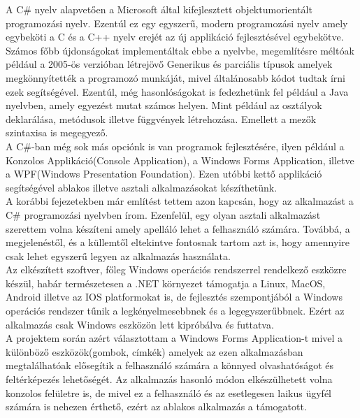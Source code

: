 \documentclass[tocnopagenum]{thesis-ekf}
\theoremstyle{definition}
\theoremstyle{remark}
\begin{document}
	A C\# nyelv alapvetően a Microsoft által kifejlesztett objektumorientált programozási nyelv.
	Ezentúl ez egy egyszerű, modern programozási nyelv amely egybeköti a C és a C++ nyelv erejét az új applikáció fejlesztésével egybekötve. \cite{hejlsberg2003c}
	\\ 
	Számos főbb újdonságokat implementáltak ebbe a nyelvbe, megemlítésre méltóak például a 2005-ös verzióban létrejövő Generikus és parciális típusok amelyek megkönnyítették a programozó munkáját, mivel általánosabb kódot tudtak írni ezek segítségével.
	Ezentúl, még hasonlóságokat is fedezhetünk fel például a Java nyelvben, amely egyezést mutat számos helyen.
	Mint például az osztályok deklarálása, metódusok illetve függvények létrehozása. Emellett a mezők szintaxisa is megegyező.
	\\
	A C\#-ban még sok más opciónk is van programok fejlesztésére, ilyen például a Konzolos Applikáció(Console Application), a Windows Forms Application, illetve a WPF(Windows Presentation Foundation). Ezen utóbbi kettő applikáció segítségével ablakos illetve asztali alkalmazásokat készíthetünk. \cite{almeida2018visual}
	\\
	A korábbi fejezetekben már említést tettem azon kapcsán, hogy az alkalmazást a C\# programozási nyelvben írom. Ezenfelül, egy olyan asztali alkalmazást szerettem volna készíteni amely apelláló lehet a felhasználó számára. Továbbá, a megjelenéstől, és a küllemtől eltekintve fontosnak tartom azt is, hogy amennyire csak lehet egyszerű legyen az alkalmazás használata.
	\\
	Az elkészített szoftver, főleg Windows operációs rendszerrel rendelkező eszközre készül, habár természetesen a .NET környezet támogatja a Linux, MacOS, Android illetve az IOS platformokat is, de fejlesztés szempontjából a Windows operációs rendszer tűnik a legkényelmesebbnek és a legegyszerűbbnek.\cite{altexsoft} Ezért az alkalmazás csak Windows eszközön lett kipróbálva és futtatva.
	\\
	A projektem során azért választottam a Windows Forms Application-t mivel a különböző eszközök(gombok, címkék) amelyek az ezen alkalmazásban megtalálhatóak elősegítik a felhasználó számára a könnyed olvashatóságot és feltérképezés lehetőségét. Az alkalmazás hasonló módon elkészülhetett volna konzolos felületre is, de mivel ez a felhasználó és az esetlegesen laikus ügyfél számára is nehezen érthető, ezért az ablakos alkalmazás a támogatott.
	\\ 
\end{document}
